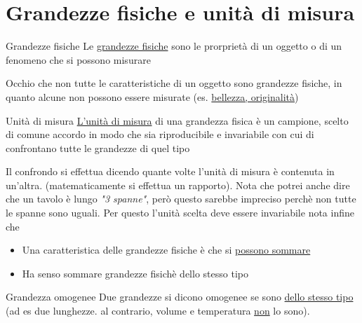 \section{Grandezze fisiche e unità di misura}
\begin{definizione}{Grandezze fisiche}
	Le \underline{grandezze fisiche} sono le prorprietà di un oggetto o di un fenomeno che si possono misurare
\end{definizione}
Occhio che non tutte le caratteristiche di un oggetto sono grandezze fisiche, in quanto alcune non possono essere misurate (es. \underline{bellezza, originalità})
\vskip3mm
\begin{definizione}{Unità di misura}
	\underline{L'unità di misura} di una grandezza fisica è un campione, scelto di comune accordo in modo che sia riproducibile e invariabile con cui di confrontano tutte le grandezze di quel tipo
\end{definizione}
Il confrondo si effettua dicendo quante volte l'unità di misura è contenuta in un'altra. (matematicamente si effettua un rapporto). Nota che potrei anche dire che un tavolo è lungo \textit{"3 spanne"}, però questo sarebbe impreciso perchè non tutte le spanne sono uguali. Per questo l'unità scelta deve essere invariabile
\vskip3mm
nota infine che
\begin{itemize}
	\item  Una caratteristica delle grandezze fisiche è che si \underline{possono sommare}
	\item Ha senso sommare grandezze fisichè dello stesso tipo
\end{itemize}
\begin{definizione}{Grandezza omogenee}
	Due grandezze si dicono omogenee se sono \underline{dello stesso tipo} (ad es due lunghezze. al contrario, volume e temperatura \underline{non} lo sono).
\end{definizione}
